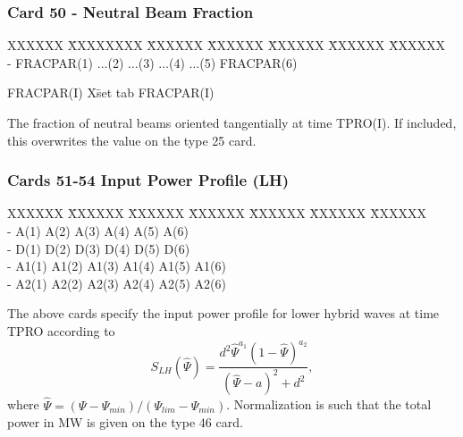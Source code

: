 \newpage \subsubsection{Card 50 - Neutral Beam Fraction}
\begin{tabbing}
XXXXXX \= XXXXXXXX \= XXXXXX \= XXXXXX \= XXXXXX \= XXXXXX \=
XXXXXX       \\
\footnotesize - \>\footnotesize  FRACPAR(1) \>\footnotesize $\ldots$(2) \>\footnotesize
$\ldots$(3) \>\footnotesize $\ldots$(4) \>\footnotesize $\ldots$(5) \>\footnotesize FRACPAR(6)
\\
\end{tabbing}
\begin{tabbing}
FRACPAR(I) X\= set tab \kill
FRACPAR(I) \> \parbox[t]{\width}{The fraction of neutral beams oriented tangentially at time
TPRO(I).  If included, this overwrites the value on the type 25 card.}
\end{tabbing}

\newpage \subsubsection{Cards 51-54 Input Power Profile (LH)}
\begin{tabbing}
XXXXXX \= XXXXXX \= XXXXXX \= XXXXXX \= XXXXXX \= XXXXXX \=XXXXXX
      \\
- \> \footnotesize A(1) \>\footnotesize A(2) \>\footnotesize A(3) \>\footnotesize A(4)
\>\footnotesize A(5) \>\footnotesize A(6)\\
- \> \footnotesize D(1) \>\footnotesize D(2) \>\footnotesize D(3) \>\footnotesize D(4)
\>\footnotesize D(5) \>\footnotesize D(6)\\
- \> \footnotesize A1(1) \>\footnotesize A1(2) \>\footnotesize A1(3) \>\footnotesize A1(4)
\>\footnotesize A1(5) \>\footnotesize A1(6)\\
- \>\footnotesize A2(1) \>\footnotesize A2(2) \>\footnotesize A2(3) \>\footnotesize A2(4)
\>\footnotesize A2(5) \>\footnotesize A2(6)\\
\end{tabbing}
The above cards specify the input power profile for lower hybrid waves at time TPRO according
to
\begin{equation}
S_{LH}(\hat{\Psi}) = \frac{d^2 \hat{\Psi}^{a_1}(1-\hat{\Psi})^{a_2}}{(\hat{\Psi}-a)^2+d^2} ,
\end{equation}
where $\hat{\Psi}=(\Psi-\Psi_{min})/(\Psi_{lim}-\Psi_{min})$.  Normalization is such that the total power
in MW is given on the type 46 card.

